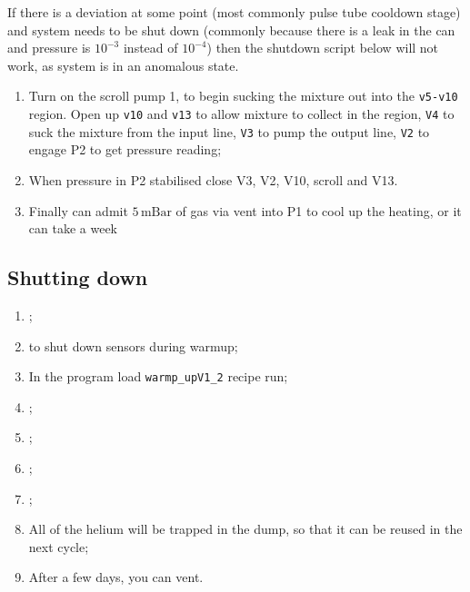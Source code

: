 If there is a deviation at some point (most commonly pulse tube cooldown stage)
and system needs to be shut down (commonly because there is a leak in the can
and pressure is $10^{-3}$ instead of $10^{-4}$) then the shutdown script below
will not work, as system is in an anomalous state.

\begin{framed}\noindent
\end{framed}

\begin{enumerate}
  \item Turn on the scroll pump 1, to begin sucking the mixture out into the
        \texttt{v5-v10} region. Open up \texttt{v10} and \texttt{v13} to allow
        mixture to collect in the region, \texttt{V4} to suck the mixture from
        the input line, \texttt{V3} to pump the output line, \texttt{V2} to
        engage P2 to get pressure reading;
  \item When pressure in P2 stabilised close V3, V2, V10, scroll and V13.
  \item Finally can admit $5\,\text{mBar}$ of gas via vent into P1 to cool up
        the heating, or it can take a week
\end{enumerate}


\subsection{Shutting down}
\begin{enumerate}
  \item {};
  \item {} to shut
        down sensors during warmup;
  \item In the program load \verb|warmp_upV1_2| recipe \ira run;
  \item {};
  \item {};
  \item {};
  \item {};
  \item {} All of the helium will
        be trapped in the dump, so that it can be reused in the next cycle;
  \item After a few days, you can vent. 
\end{enumerate}

